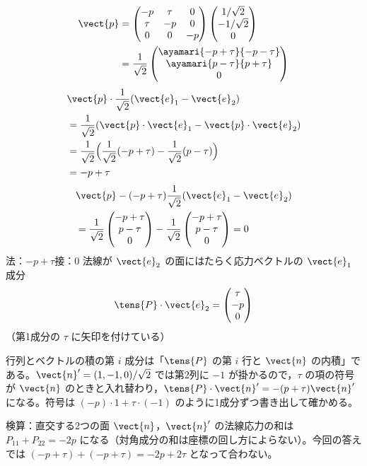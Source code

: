 \begin{align*}
\vect{p}&=\begin{pmatrix}-p&\tau&0\\\tau&-p&0\\0&0&-p\end{pmatrix}\begin{pmatrix}1/\sqrt{2}\\-1/\sqrt{2}\\0\end{pmatrix}\\
&=\frac{1}{\sqrt{2}}\begin{pmatrix}\ayamari{-p+\tau}{-p-\tau}\\\ayamari{p-\tau}{p+\tau}\\0\end{pmatrix}
\end{align*}
\begin{align*}
&\vect{p}\cdot\frac{1}{\sqrt{2}}(\vect{e}_{1}-\vect{e}_{2})\\
&=\frac{1}{\sqrt{2}}(\vect{p}\cdot\vect{e}_{1}-\vect{p}\cdot\vect{e}_{2})\\
&=\frac{1}{\sqrt{2}}\Bigl(\frac{1}{\sqrt{2}}(-p+\tau)-\frac{1}{\sqrt{2}}(p-\tau)\Bigr)\\
&=-p+\tau
\end{align*}
\begin{align*}
&\vect{p}-(-p+\tau)\frac{1}{\sqrt{2}}(\vect{e}_{1}-\vect{e}_{2})\\
&=\frac{1}{\sqrt{2}}\begin{pmatrix}-p+\tau\\p-\tau\\0\end{pmatrix}-\frac{1}{\sqrt{2}}\begin{pmatrix}-p+\tau\\p-\tau\\0\end{pmatrix}=0
\end{align*}
法：$-p+\tau$\quad 接：$0$
法線が $\vect{e}_{2}$ の面にはたらく応力ベクトルの $\vect{e}_{1}$ 成分
\[ \tens{P}\cdot\vect{e}_{2}=\begin{pmatrix}\tau\\-p\\0\end{pmatrix} \]
（第1成分の $\tau$ に矢印を付けている）
\item 行列とベクトルの積の第 $i$ 成分は「$\tens{P}$ の第 $i$ 行と $\vect{n}$ の内積」である。$\vect{n}'=(1,-1,0)/\sqrt{2}$ では第2列に $-1$ が掛かるので，$\tau$ の項の符号が $\vect{n}$ のときと入れ替わり，$\tens{P}\cdot\vect{n}'=-(p+\tau)\vect{n}'$ になる。符号は $(-p)\cdot1+\tau\cdot(-1)$ のように1成分ずつ書き出して確かめる。
\item 検算：直交する2つの面 $\vect{n}$，$\vect{n}'$ の法線応力の和は $P_{11}+P_{22}=-2p$ になる（対角成分の和は座標の回し方によらない）。今回の答えでは $(-p+\tau)+(-p+\tau)=-2p+2\tau$ となって合わない。
